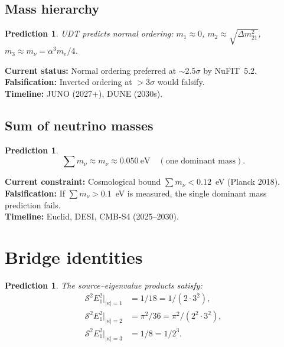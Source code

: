 \documentclass[11pt,letterpaper]{article}
\newtheorem{prediction}[theorem]{Prediction}
\numberwithin{equation}{section}
\begin{document}
\subsection{Mass hierarchy}

\begin{prediction}
UDT predicts normal ordering: $m_1 \approx 0$, $m_2 \approx \sqrt{\Delta m^2_{21}}$,
$m_3 \approx m_\nu = \alpha^3 m_e/4$.
\end{prediction}

\noindent\textbf{Current status:} Normal ordering preferred at $\sim 2.5\sigma$
by NuFIT~5.2.\\
\textbf{Falsification:} Inverted ordering at $> 3\sigma$ would falsify.\\
\textbf{Timeline:} JUNO (2027+), DUNE (2030s).

\subsection{Sum of neutrino masses}

\begin{prediction}
\begin{equation}
  \sum m_\nu \approx m_\nu \approx 0.050~\mathrm{eV}
  \quad (\text{one dominant mass}).
\end{equation}
\end{prediction}

\noindent\textbf{Current constraint:} Cosmological bound $\sum m_\nu < 0.12$~eV
(Planck 2018).\\
\textbf{Falsification:} If $\sum m_\nu > 0.1$~eV is measured, the single
dominant mass prediction fails.\\
\textbf{Timeline:} Euclid, DESI, CMB-S4 (2025--2030).

\section{Bridge identities}
\label{sec:bridge}

\begin{prediction}
The source--eigenvalue products satisfy:
\begin{align}
  \mathcal{S}^2 E_1^2\big|_{|\kappa|=1} &= 1/18 = 1/(2 \cdot 3^2), \\
  \mathcal{S}^2 E_1^2\big|_{|\kappa|=2} &= \pi^2/36 = \pi^2/(2^2 \cdot 3^2), \\
  \mathcal{S}^2 E_1^2\big|_{|\kappa|=3} &= 1/8 = 1/2^3.
\end{align}
\end{prediction}
\end{document}
